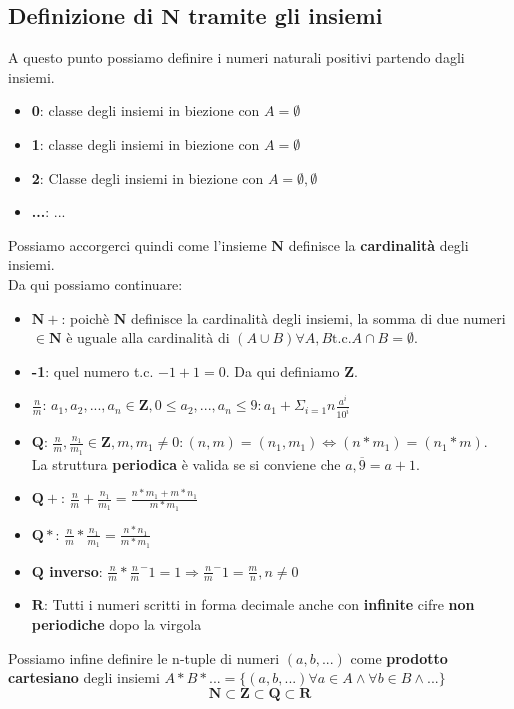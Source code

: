     \subsection{Definizione di $\mathbf{N}$ tramite gli insiemi}
    A questo punto possiamo definire i numeri naturali positivi partendo dagli insiemi.
    \begin{itemize}
        \item \textbf{0}: classe degli insiemi in biezione con $A = \emptyset$
        \item \textbf{1}: classe degli insiemi in biezione con $A = {\emptyset}$
        \item \textbf{2}: Classe degli insiemi in biezione con $A = {\emptyset, {\emptyset}}$
        \item \textbf{...}: ...
    \end{itemize}
    Possiamo accorgerci quindi come l'insieme $\mathbf{N}$ definisce la \textbf{cardinalità}
    degli insiemi. \\
    Da qui possiamo continuare:
    \begin{itemize}
        \item \textbf{$\mathbf{N} +$}: poichè $\mathbf{N}$ definisce la cardinalità degli insiemi,
            la somma di due numeri $\in \mathbf{N}$ è uguale alla cardinalità di 
            $(A \cup B) \forall A, B \textrm{t.c.} A \cap B = \emptyset$.
        \item \textbf{-1}: quel numero t.c. $-1 + 1 = 0$. Da qui definiamo $\mathbf{Z}$.
        \item \textbf{$\frac{n}{m}$}: 
            $a_1, a_2, ..., a_n \in \mathbf{Z}, 0 \leq a_2, ..., a_n \leq 9:
            a_1 + \Sigma_{i=1}{n}\frac{a^i}{10^i}$
        \item \textbf{$\mathbf{Q}$}: 
            ${\frac{n}{m},\frac{n_1}{m_1} \in \mathbf{Z}, m, m_1 \neq 0: 
            (n, m) = (n_1, m_1) \Longleftrightarrow (n * m_1) = (n_1 * m)}$. \\
            La struttura \textbf{periodica} è valida se si conviene che 
            $a,\overline{9} = a + 1$.
        \item \textbf{$\mathbf{Q} +$}: 
            $\frac{n}{m} + \frac{n_1}{m_1} = \frac{n * m_1 + m * n_1}{m * m_1}$
        \item \textbf{$\mathbf{Q} *$}:
            $\frac{n}{m} * \frac{n_1}{m_1} = \frac{n * n_1}{m * m_1}$
        \item \textbf{$\mathbf{Q}$ inverso}: 
            $\frac{n}{m} * \frac{n}{m}^-1 = 1 \Longrightarrow 
            \frac{n}{m}^-1 = \frac{m}{n}, n \neq 0$
        \item \textbf{$\mathbf{R}$}: {Tutti i numeri scritti in forma decimale
            anche con \textbf{infinite} cifre \textbf{non periodiche} dopo la virgola}
    \end{itemize}
    Possiamo infine definire le n-tuple di numeri $\left(a, b, ...\right)$ come
    \textbf{prodotto cartesiano} degli insiemi $A * B * ... = \{(a, b, ...) 
    \forall a \in A \wedge \forall b \in B \wedge ...\}$
    $$\mathbf{N} \subset \mathbf{Z} \subset \mathbf{Q} \subset \mathbf{R}$$
